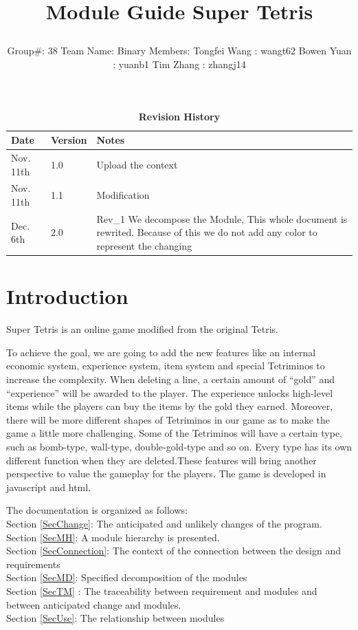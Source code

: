 \documentclass[12pt, titlepage]{article}
\title{\parbox{\linewidth}{\centering Module Guide \endgraf\bigskip Super Tetris}}
\author{\parbox{\linewidth}{\bigskip \centering Group\#: 38 \endgraf\bigskip Team Name: Binary \endgraf\bigskip Members: \endgraf\bigskip Tongfei Wang : wangt62 \endgraf\bigskip Bowen Yuan : yuanb1 \endgraf\bigskip Tim Zhang : zhangj14}}
\date{\parbox{\linewidth}{\bigskip\bigskip \centering \today\endgraf\bigskip SFWR ENG 3XA3 \endgraf\bigskip McMaster University}}
\begin{document}
\maketitle

\tableofcontents
\listoftables
\listoffigures

\begin{table}[bp]
\caption{\bf Revision History}
\begin{tabularx}{\textwidth}{p{3cm}p{2cm}X}
\toprule {\bf Date} & {\bf Version} & {\bf Notes}\\
\midrule
Nov. 11th& 1.0 & Upload the context\\
Nov. 11th & 1.1 & Modification\\
Dec. 6th & 2.0 & Rev\_1 We decompose the Module, This whole document is rewrited. Because of this we do not add any color to represent the changing \\
\bottomrule
\end{tabularx}
\end{table}

\newpage


\section{Introduction}

 Super Tetris is an online game modified from the original Tetris.

To achieve the goal, we are going to add the new features like an internal economic system, experience system, item system and special Tetriminos to increase the complexity. When deleting a line, a certain amount of “gold” and “experience” will be awarded to the player. The experience unlocks high-level items while the players can buy the items by the gold they earned. Moreover, there will be more different shapes of Tetriminos in our game as to make the game a little more challenging. Some of the Tetriminos will have a certain type, such as bomb-type, wall-type, double-gold-type and so on. Every type has its own different function when they are deleted.These features will bring another perspective to value the gameplay for the players. The game is developed in javascript and html.

 The documentation  is organized as follows:\\
 Section \ref{SecChange}: The anticipated and unlikely changes of the program. \\
 Section \ref{SecMH}: A module hierarchy is presented.\\
 Section \ref{SecConnection}: The context of the connection between the design and requirements\\
 Section \ref{SecMD}: Specified decomposition of the modules\\
 Section  \ref{SecTM} : The traceability between requirement and modules and between anticipated change and modules.\\
 Section \ref{SecUse}: The relationship between modules\\
\end{document}

